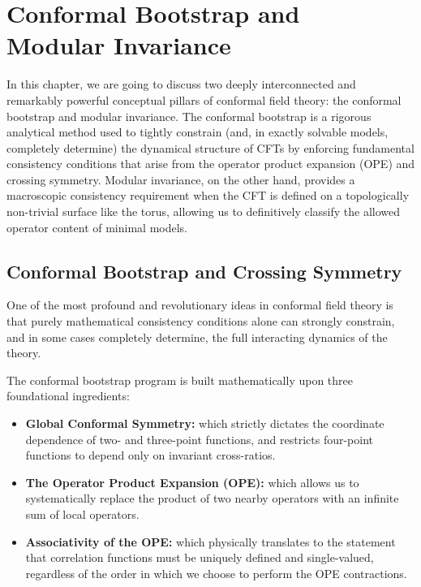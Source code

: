 \chapter[Conformal Bootstrap and Modular Invariance]{Conformal Bootstrap and\\Modular Invariance}

In this chapter, we are going to discuss two deeply interconnected and remarkably powerful conceptual pillars of conformal field theory: the conformal bootstrap and modular invariance. The conformal bootstrap is a rigorous analytical method used to tightly constrain (and, in exactly solvable models, completely determine) the dynamical structure of CFTs by enforcing fundamental consistency conditions that arise from the operator product expansion (OPE) and crossing symmetry. Modular invariance, on the other hand, provides a macroscopic consistency requirement when the CFT is defined on a topologically non-trivial surface like the torus, allowing us to definitively classify the allowed operator content of minimal models.

\section{Conformal Bootstrap and Crossing Symmetry}

One of the most profound and revolutionary ideas in conformal field theory is that purely mathematical consistency conditions alone can strongly constrain, and in some cases completely determine, the full interacting dynamics of the theory.

The conformal bootstrap program is built mathematically upon three foundational ingredients:
\begin{itemize}
    \item \textbf{Global Conformal Symmetry:} which strictly dictates the coordinate dependence of two- and three-point functions, and restricts four-point functions to depend only on invariant cross-ratios.
    \item \textbf{The Operator Product Expansion (OPE):} which allows us to systematically replace the product of two nearby operators with an infinite sum of local operators.
    \item \textbf{Associativity of the OPE:} which physically translates to the statement that correlation functions must be uniquely defined and single-valued, regardless of the order in which we choose to perform the OPE contractions.
\end{itemize}

